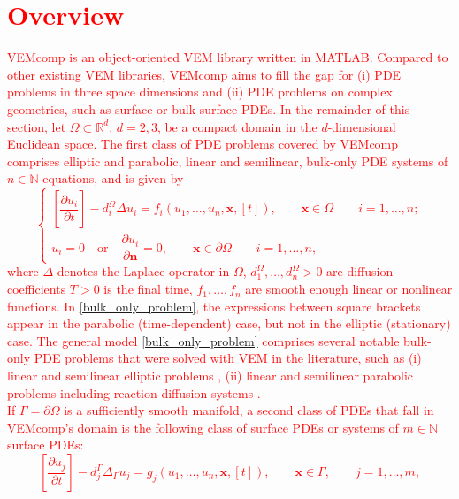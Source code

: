 \documentclass[a4paper]{article}
\newcommand{\boldn}{\boldsymbol{n}}
\newcommand{\boldx}{\boldsymbol{x}}
\newcommand{\red}[1]{\textcolor{red}{#1}}
\begin{document}
\section{\red{Overview}}
\label{sec:overview}
\red{VEMcomp is an object-oriented VEM library written in MATLAB.  Compared to other existing VEM libraries, VEMcomp aims to fill the gap for (i) PDE problems in three space dimensions and (ii) PDE problems on complex geometries, such as surface or bulk-surface PDEs. In the remainder of this section, let $\Omega \subset \mathbb{R}^d$, $d=2,3$, be a compact domain in the $d$-dimensional Euclidean space.  The first class of PDE problems covered by VEMcomp comprises elliptic and parabolic, linear and semilinear, bulk-only PDE systems of $n\in\mathbb{N}$ equations, and is given by
\begin{equation}
\label{bulk_only_problem}
\begin{cases}
\left[\dfrac{\partial u_i}{\partial t}\right] - d_i^\Omega\Delta u_i = f_i(u_1,\dots, u_n, \boldx, [t]), \qquad \boldx \in \Omega \qquad  i=1,\dots,n;\\
u_{i} = 0 \quad \text{or} \quad \dfrac{\partial u_i}{\partial \boldn} = 0,  \qquad \boldx \in \partial \Omega\qquad  i=1,\dots,n,
\end{cases}
\end{equation}
where $\Delta$ denotes the Laplace operator in $\Omega$, $d_1^\Omega,\dots, d_n^\Omega > 0$ are diffusion coefficients $T>0$ is the final time, $f_1, \dots, f_n$ are smooth enough linear or nonlinear functions. In \eqref{bulk_only_problem}, the expressions between square brackets appear in the parabolic (time-dependent) case, but not in the elliptic (stationary) case. The general model \eqref{bulk_only_problem} comprises several notable bulk-only PDE problems that were solved with VEM in the literature, such as (i) linear \cite{beirao2013basic, da2017high,da2019virtual} and semilinear elliptic problems \cite{xiao2022nonconforming},  (ii) linear \cite{vacca2015virtual} and semilinear parabolic problems \cite{adak2019convergence} including reaction-diffusion systems \cite{huang2021posteriori}.\\
If $\Gamma = \partial \Omega$ is a sufficiently smooth manifold, a second class of PDEs that fall in VEMcomp's domain is the following class of surface PDEs or systems of $m\in\mathbb{N}$ surface PDEs:
\begin{equation}
\label{surface_problems}
\left[\frac{\partial u_j}{\partial t}\right] - d_j^\Gamma \Delta_\Gamma u_j = g_j(u_1,\dots,u_n, \boldx, [t]), \qquad \boldx \in \Gamma, \qquad j=1,\dots,m,

\end{equation}}
\end{document}
